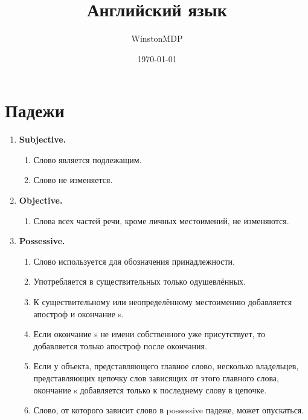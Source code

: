 \documentclass[oneside]{book}
\title{Английский язык}
\date{\today}
\author{WinstonMDP}
\begin{document}
    \maketitle

    \tableofcontents

    \chapter{Падежи}
    \begin{enumerate}
        \item \textbf{Subjective.}
        \begin{enumerate}
            \item Слово является подлежащим.
            \item Слово не изменяется.
        \end{enumerate}

        \item \textbf{Objective.}
        \begin{enumerate}
            \item Слова всех частей речи, кроме личных
            местоимений, не изменяются.
        \end{enumerate}

        \item \textbf{Possessive.}
        \begin{enumerate}
            \item Слово используется для обозначения
            принадлежности.

            \item Употребляется в существительных
            только одушевлённых.

            \item К существительному или неопределённому местоимению добавляется \\
            апостроф и окончание s.

            \item Если окончание s не имени собственного
            уже присутствует, то добавляется
            только апостроф после окончания.

            \item Если у объекта, представляющего
            главное слово, несколько владельцев,
            представляющих цепочку слов зависящих от этого главного слова,
            окончание s добавляется
            только к последнему слову в цепочке.

            \item Слово, от которого зависит
            слово в possessive падеже,
            может опускаться.
        \end{enumerate}


\end{enumerate}
\end{document}
